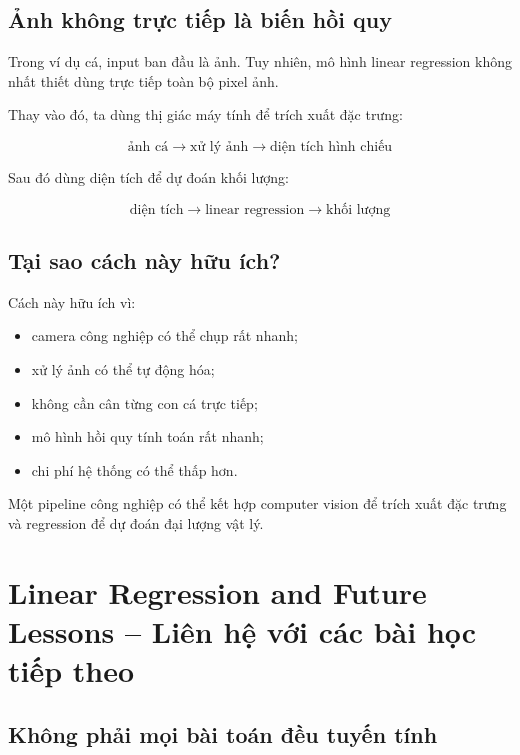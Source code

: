 \subsection{Ảnh không trực tiếp là biến hồi quy}

Trong ví dụ cá, input ban đầu là ảnh. Tuy nhiên, mô hình linear regression không nhất thiết dùng trực tiếp toàn bộ pixel ảnh.

Thay vào đó, ta dùng thị giác máy tính để trích xuất đặc trưng:

\[
    \text{ảnh cá}
    \rightarrow
    \text{xử lý ảnh}
    \rightarrow
    \text{diện tích hình chiếu}
\]

Sau đó dùng diện tích để dự đoán khối lượng:

\[
    \text{diện tích}
    \rightarrow
    \text{linear regression}
    \rightarrow
    \text{khối lượng}
\]

\subsection{Tại sao cách này hữu ích?}

Cách này hữu ích vì:

\begin{itemize}
    \item camera công nghiệp có thể chụp rất nhanh;
    \item xử lý ảnh có thể tự động hóa;
    \item không cần cân từng con cá trực tiếp;
    \item mô hình hồi quy tính toán rất nhanh;
    \item chi phí hệ thống có thể thấp hơn.
\end{itemize}

\begin{ghinho}
Một pipeline công nghiệp có thể kết hợp computer vision để trích xuất đặc trưng và regression để dự đoán đại lượng vật lý.
\end{ghinho}

\section{Linear Regression and Future Lessons -- Liên hệ với các bài học tiếp theo}

\subsection{Không phải mọi bài toán đều tuyến tính}

